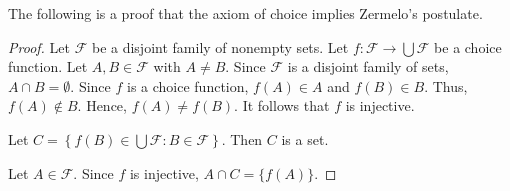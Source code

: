 \documentclass[12pt]{article}
\begin{document}
The following is a proof that the axiom of choice implies Zermelo's postulate.

\begin{proof}
Let $\mathcal{F}$ be a disjoint family of nonempty sets.  Let $\displaystyle f \colon \mathcal{F} \to \bigcup \mathcal{F}$ be a choice function.  Let $A,B \in \mathcal{F}$ with $A \neq B$.  Since $\mathcal{F}$ is a disjoint family of sets, $\displaystyle A \cap B = \emptyset$.  Since $f$ is a choice function, $f(A) \in A$ and $f(B) \in B$.  Thus, $f(A) \notin B$.  Hence, $f(A) \neq f(B)$.  It follows that $f$ is injective.

Let $\displaystyle C=\left\{f(B) \in \bigcup \mathcal{F} : B \in \mathcal{F} \right\}$.  Then $C$ is a set.

Let $A \in \mathcal{F}$.  Since $f$ is injective, $\displaystyle A \cap C=\{f(A)\}$.
\end{proof}
\end{document}
